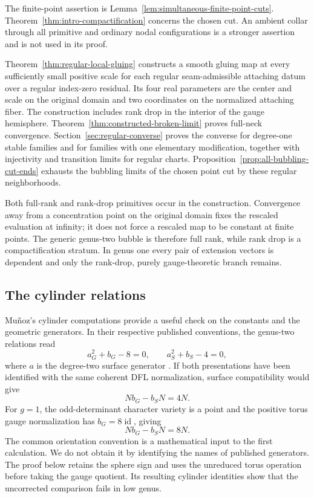 \documentclass[11pt]{amsart}
\theoremstyle{definition}
\theoremstyle{remark}
\theoremstyle{plain}
\newcommand{\id}{\operatorname{id}}
\begin{document}
The finite-point assertion is
Lemma~\ref{lem:simultaneous-finite-point-cuts}.
Theorem~\ref{thm:intro-compactification} concerns the chosen cut. An ambient collar through
all primitive and ordinary nodal configurations is a stronger
assertion and is not used in its proof.

Theorem~\ref{thm:regular-local-gluing} constructs a smooth gluing map
at every sufficiently small positive scale for each regular
seam-admissible attaching datum over a regular index-zero residual.
Its four real parameters are the center and scale on the original
domain and two coordinates on the normalized attaching fiber.
The construction includes rank drop in the interior of the gauge
hemisphere.
Theorem~\ref{thm:constructed-broken-limit} proves full-neck convergence.
Section~\ref{sec:regular-converse} proves the converse for degree-one
stable families and for families with one elementary modification,
together with injectivity and transition limits for regular charts.
Proposition~\ref{prop:all-bubbling-cut-ends} exhausts the
bubbling limits of the chosen point cut by these regular neighborhoods.

Both full-rank and rank-drop primitives occur in the construction.
Convergence away from a
concentration point on the original domain fixes the rescaled evaluation at infinity;
it does not force a rescaled map to be constant at finite points.  The
generic genus-two bubble is therefore full rank, while rank drop is a
compactification stratum.  In genus one every pair of extension vectors is
dependent and only the rank-drop, purely gauge-theoretic branch remains.

\subsection{The cylinder relations}
Mu\~noz's cylinder computations provide a useful check on the
constants and the geometric generators. In their respective
published conventions, the genus-two relations read
\[
                 a_G^2+b_G-8=0,
             \qquad a_S^2+b_S-4=0,
\]
where $a$ is the degree-two surface generator
\cite{Munoz99a,Munoz99b}. If both presentations have been
identified with the same coherent DFL normalization,
surface compatibility would give
\[
                      Nb_G-b_SN=4N.
\]
For $g=1$, the odd-determinant character variety is a point
and the positive torus gauge normalization has $b_G=8\id$, giving
\[
                      Nb_G-b_SN=8N.
\]
The common orientation convention is a mathematical input
to the first calculation. We do not obtain it by identifying
the names of published generators. The proof below retains
the sphere sign and uses the unreduced torus operation
before taking the gauge quotient. Its resulting cylinder
identities show that the uncorrected comparison fails in low genus.
\end{document}
